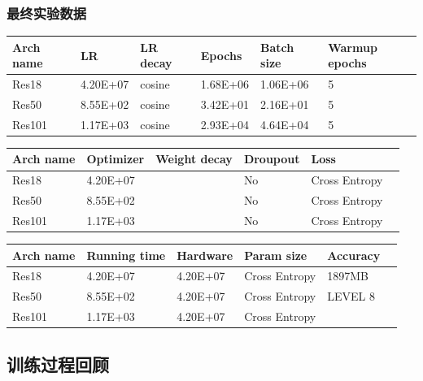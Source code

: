 \documentclass[hyperref, UTF8, 12pt]{article}
\theoremstyle{definition}
\begin{document}
\subsubsection{最终实验数据}
\begin{table}[h]
	\begin{tabular}{|l|l|l|l|l|l|}
		\hline
		Arch name & LR       & LR decay & Epochs   & Batch size & Warmup epochs \\ \hline
		Res18     & 4.20E+07 & cosine   & 1.68E+06 & 1.06E+06   & 5             \\ \hline
		Res50     & 8.55E+02 & cosine   & 3.42E+01 & 2.16E+01   & 5              \\ \hline
		Res101    & 1.17E+03 & cosine   & 2.93E+04 & 4.64E+04   &  5            \\ \hline
	\end{tabular}
\end{table}

\begin{table}[h]
	\begin{tabular}{|l|l|l|l|l|l|}
		\hline
		Arch name & Optimizer& Weight decay & Droupout   & Loss           \\ \hline
		Res18     & 4.20E+07 &         	    & No 	     & Cross Entropy  \\ \hline
		Res50     & 8.55E+02 &              & No         & Cross Entropy  \\ \hline
		Res101    & 1.17E+03 &              & No         & Cross Entropy  \\ \hline
	\end{tabular}
\end{table}

\begin{table}[h]
	\begin{tabular}{|l|l|l|l|l|l|}
		\hline
		Arch name & Running time & Hardware     & Param size     & Accuracy 	 \\ \hline
		Res18     & 4.20E+07     & 4.20E+07     & Cross Entropy  & 1897MB        \\ \hline
		Res50     & 8.55E+02     & 4.20E+07     & Cross Entropy  & LEVEL 8       \\ \hline
		Res101    & 1.17E+03     & 4.20E+07      & Cross Entropy &               \\ \hline
	\end{tabular}
\end{table}



\subsection{训练过程回顾}
\end{document}
